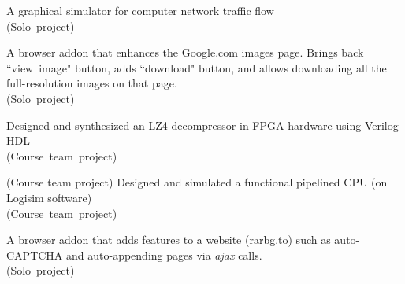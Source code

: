 




A graphical simulator for computer network traffic flow\\
\small{(Solo~project)}\\

\divider

A browser addon that enhances the Google.com images page. Brings back ``view~image" button, adds ``download" button, and allows downloading all the full-resolution images on that page.\\
\small{(Solo~project)}\\

\divider


Designed and synthesized an LZ4 decompressor in FPGA hardware using Verilog HDL\\
\small{(Course~team~project)}\\

\divider

(Course team project) Designed and simulated a functional pipelined CPU (on Logisim software)\\
\small{(Course~team~project)}\\

\divider

A browser addon that adds features to a website (rarbg.to) such as auto-CAPTCHA and auto-appending pages via \textit{ajax} calls.\\
\small{(Solo~project)}\\

\cvproject{}